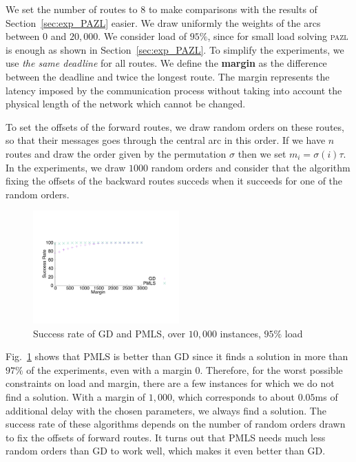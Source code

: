 \documentclass[10pt, conference, letterpaper]{IEEEtran}
\newcommand\pazl{\textsc{pazl}\xspace}
\begin{document}
    We set the number of routes to $8$ to make comparisons with the results of Section~\ref{sec:exp_PAZL} easier. 
    We draw uniformly the weights of the arcs between $0$ and $20,000$. We consider load of $95\%$, since for small load solving \pazl is enough as shown in Section~\ref{sec:exp_PAZL}. To simplify the experiments, 
    we use \emph{the same deadline} for all routes. We define the {\bf margin} as the difference between the deadline and twice the longest route. The margin represents the latency imposed by the communication process without taking into account the physical length of the network which cannot be changed.
  
   
   To set the offsets of the forward routes, we draw random orders on these routes, so that their messages goes through 
   the central arc in this order. If we have $n$ routes and draw the order given by the permutation $\sigma$ then we set $m_{i} = \sigma(i)\tau$. In the experiments, we draw $1000$ random orders and consider that the algorithm fixing the offsets of the backward routes succeds when it succeeds for one of the random orders.
      
     
    \begin{figure} 
       \begin{center}
      \includegraphics[width=0.5\textwidth]{retour_21000.pdf}
      \end{center}
      \caption{Success rate of GD and PMLS, over $10,000$ instances, $95\%$ load}
     \label{fig:success21000}
    
     \end{figure}
        
     
Fig.~\ref{fig:success21000} shows that PMLS is better than GD since it finds a solution in more than $97\%$ of the experiments, even with a margin $0$. Therefore, for the worst possible constraints on load and margin, there are a few instances for which we do not find a solution. With a margin of $1,000$, which corresponds to about $0.05$ms of additional delay with the chosen parameters, we always find a solution. The success rate of these algorithms depends on the number of random orders drawn to fix the offsets of forward routes. It turns out that PMLS needs much less random orders than GD to work well, which makes it even better than GD.   
\end{document}
